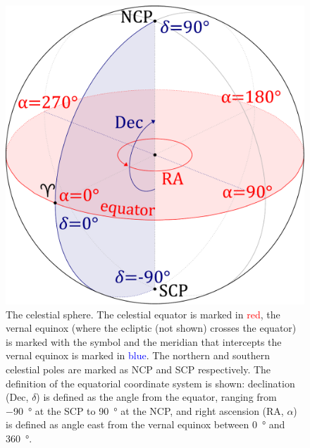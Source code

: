\begin{colsection}
\begin{colsection}
\begin{figure}[p]
\begin{center}
\includegraphics[width=\linewidth]{images/globe1.pdf}
\end{center}
\caption[The celestial sphere]{The celestial sphere. The celestial equator is marked in \textcolor{red}{red}, the vernal equinox (where the ecliptic (not shown) crosses the equator) is marked with the symbol \Aries{} and the meridian that intercepts the vernal equinox is marked in \textcolor{blue}{blue}. The northern and southern celestial poles are marked as NCP and SCP respectively. The definition of the equatorial coordinate system is shown: declination (Dec, $\delta$) is defined as the angle from the equator, ranging from \SI{-90}{\degree} at the SCP to \SI{90}{\degree} at the NCP, and right ascension (RA, $\alpha$) is defined as angle east from the vernal equinox between \SI{0}{\degree} and \SI{360}{\degree}.
}
\label{fig:sphere}
\end{figure}


\end{colsection}
\end{colsection}
